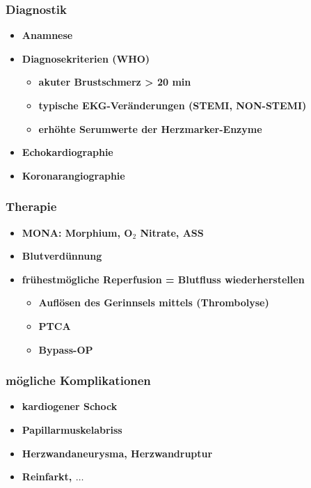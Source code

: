 		\subsubsection*{Diagnostik}
			\begin{itemize}
				\item \textbf{Anamnese}
				\item \textbf{Diagnosekriterien (WHO)}
					\begin{itemize}
						\item \textbf{akuter Brustschmerz > 20 min}
						\item \textbf{typische EKG-Veränderungen (STEMI, NON-STEMI)}
						\item \textbf{erhöhte Serumwerte der Herzmarker-Enzyme}
					\end{itemize}
				\item \textbf{Echokardiographie}
				\item \textbf{Koronarangiographie}
			\end{itemize}
		\subsubsection*{Therapie}
			\begin{itemize}
			\item \textbf{MONA: Morphium, O$_2$ Nitrate, ASS}
			\item \textbf{Blutverdünnung}
			\item \textbf{frühestmögliche Reperfusion = Blutfluss wiederherstellen}
				\begin{itemize}
					\item \textbf{Auflösen des Gerinnsels mittels (Thrombolyse)}
					\item \textbf{PTCA}
					\item \textbf{Bypass-OP}
				\end{itemize}
			\end{itemize}
		\subsubsection*{mögliche Komplikationen}
			\begin{itemize}
				\item \textbf{kardiogener Schock}
				\item \textbf{Papillarmuskelabriss}
				\item \textbf{Herzwandaneurysma, Herzwandruptur}
				\item \textbf{Reinfarkt, $\dots$}
			\end{itemize}
